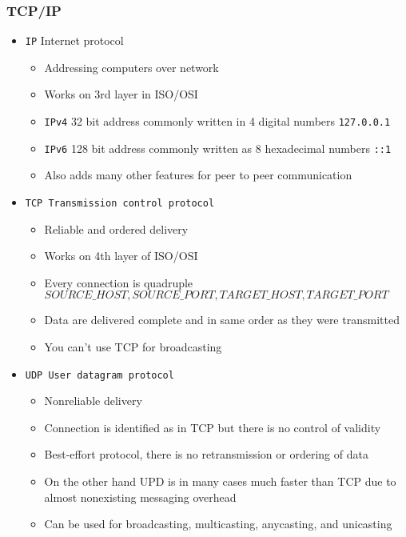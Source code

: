 \documentclass{beamer}
\begin{document}
    \begin{frame}[allowframebreaks]
        \small
        \frametitle{TCP/IP}
        \begin{itemize}
            \item \texttt{IP} Internet protocol
            \begin{itemize}
                \item Addressing computers over network
                \item Works on 3rd layer in ISO/OSI
                \item \texttt{IPv4} 32 bit address commonly written in 4 digital numbers \texttt{127.0.0.1}
                \item \texttt{IPv6} 128 bit address commonly written as 8 hexadecimal numbers \texttt{::1}
                \item Also adds many other features for peer to peer communication
            \end{itemize}
            \framebreak
            \item \texttt{TCP Transmission control protocol}
            \begin{itemize}
                \item Reliable and ordered delivery
                \item Works on 4th layer of ISO/OSI
                \item Every connection is quadruple \texttt{\(SOURCE\_HOST, SOURCE\_PORT, TARGET\_HOST, TARGET\_PORT\)}
                \item Data are delivered complete and in same order as they were transmitted
                \item You can't use TCP for broadcasting
            \end{itemize}
            \framebreak
            \item \texttt{UDP User datagram protocol}
            \begin{itemize}
                \item Nonreliable delivery
                \item Connection is identified as in TCP but there is no control of validity
                \item Best-effort protocol, there is no retransmission or ordering of data
                \item On the other hand UPD is in many cases much faster than TCP due to almost nonexisting messaging overhead
                \item Can be used for broadcasting, multicasting, anycasting, and unicasting
            \end{itemize}
        \end{itemize}

    \end{frame}
\end{document}
